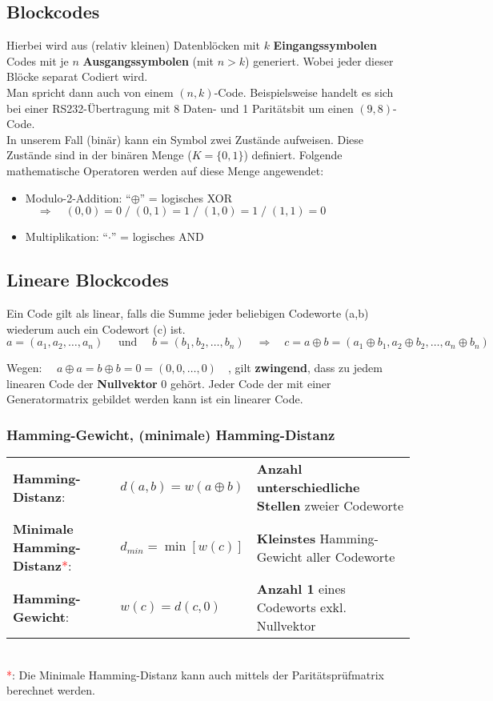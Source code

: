 \subsection{Blockcodes}
Hierbei wird aus (relativ kleinen) Datenblöcken mit \boldmath$k$ \textbf{Eingangssymbolen} Codes mit
je $n$ \unboldmath \textbf{Ausgangssymbolen} (mit $n > k$) generiert. Wobei jeder dieser Blöcke
separat Codiert wird. \\ Man spricht dann auch von einem $(n,k)$-Code. Beispielsweise handelt es
sich bei einer RS232-Übertragung mit 8 Daten- und 1 Paritätsbit um einen $(9,8)$-Code. \\

In unserem Fall (binär) kann ein Symbol zwei Zustände aufweisen. Diese Zustände sind in der binären
Menge ($K=\{0,1\}$) definiert.
Folgende mathematische Operatoren werden auf diese Menge angewendet:
\begin{itemize}
  \item Modulo-2-Addition: ``$\oplus$'' = logisches XOR $\quad\Rightarrow
  \quad(0,0)=0\;/\;(0,1)=1\;/\;(1,0)=1\;/\;(1,1)=0$
  \item Multiplikation: ``$\cdot$'' = logisches AND
\end{itemize}


\subsection{Lineare Blockcodes }
Ein Code gilt als linear, falls die Summe jeder beliebigen Codeworte (a,b) wiederum auch ein
Codewort (c) ist. 
$$a = (a_1, a_2, \ldots, a_n) \quad \text{ und } \quad b = (b_1, b_2, \ldots, b_n) \quad
\Longrightarrow \quad c = a \oplus b = (a_1 \oplus b_1, a_2 \oplus b_2, \ldots, a_n \oplus b_n)$$

Wegen: $\quad a \oplus a = b \oplus b = 0 = (0,0,\ldots,0) \quad$, gilt \textbf{zwingend}, dass
zu jedem linearen Code der \textbf{Nullvektor} $0$ gehört. Jeder Code der mit einer Generatormatrix
gebildet werden kann ist ein linearer Code.

\subsubsection{Hamming-Gewicht, (minimale) Hamming-Distanz }
\renewcommand{\arraystretch}{1.4}
\begin{tabular}[c]{ p{5.7cm}  p{3.7cm} p{9cm} }
	\textbf{Hamming-Distanz}:
	& $d(a,b) = w(a \oplus b)$
	& \textbf{Anzahl unterschiedliche Stellen} zweier Codeworte \\
	\textbf{Minimale Hamming-Distanz}\textcolor{red}{*}:
	& $d_{min} = \min{[w(c)]}$
	& \textbf{Kleinstes} Hamming-Gewicht aller Codeworte \\
	\textbf{Hamming-Gewicht}: 
	& $w(c) = d(c,0)$
	& \textbf{Anzahl 1} eines Codeworts exkl. Nullvektor
\end{tabular}
\renewcommand{\arraystretch}{1} \\
\textcolor{red}{*}: Die Minimale Hamming-Distanz kann auch mittels der Paritätsprüfmatrix
 berechnet werden.


